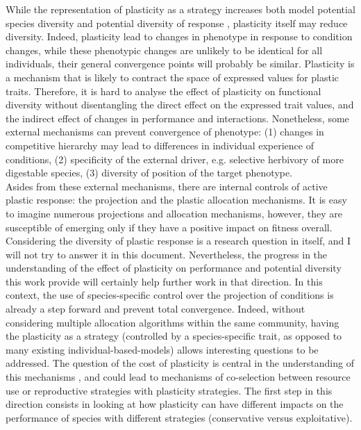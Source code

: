 While the representation of plasticity as a strategy increases both model potential species diversity and potential diversity of response \parencite{ ryser_consequences_2000, kichenin_contrasting_2013}, plasticity itself may reduce diversity. Indeed, plasticity lead to changes in phenotype in response to condition changes, while these phenotypic changes are unlikely to be identical for all individuals, their general convergence points will probably be similar. Plasticity is a mechanism that is likely to contract the space of expressed values for plastic traits. Therefore, it is hard to analyse the effect of plasticity on functional diversity without disentangling the direct effect on the expressed trait values, and the indirect effect of changes in performance and interactions. Nonetheless, some external mechanisms can prevent convergence of phenotype: (1) changes in competitive hierarchy may lead to differences in individual experience of conditions, (2) specificity of the external driver, e.g. selective herbivory of more digestable species, (3) diversity of position of the target phenotype. \\
Asides from these external mechanisms, there are internal controls of active plastic response: the projection and the plastic allocation mechanisms. It is easy to imagine numerous projections and allocation mechanisms, however, they are susceptible of emerging only if they have a positive impact on fitness overall. Considering the diversity of plastic response is a research question in itself, and I will not try to answer it in this document. Nevertheless, the progress in the understanding of the effect of plasticity on performance and potential diversity this work provide will certainly help further work in that direction. In this context, the use of species-specific control over the projection of conditions is already a step forward and prevent total convergence. Indeed, without considering multiple allocation algorithms within the same community, having the plasticity as a strategy \parencite{bradshaw_unravelling_2006} (controlled by a species-specific trait, as opposed to many existing individual-based-models) allows interesting questions to be addressed. The question of the cost of plasticity is central in the understanding of this mechanisms \parencite{dewitt_costs_1998, auld_re-evaluating_2009}, and could lead to mechanisms of co-selection between resource use or reproductive strategies with plasticity strategies. The first step in this direction consists in looking at how plasticity can have different impacts on the performance of species with different strategies (conservative versus exploitative).



